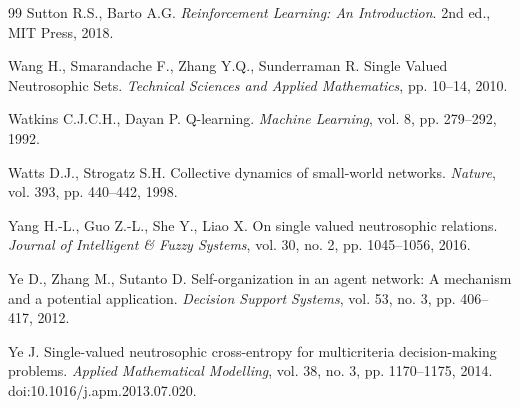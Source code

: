 \documentclass[11pt,a4paper]{article}
\begin{document}
\begin{thebibliography}{99}
		 Sutton R.S., Barto A.G. \textit{Reinforcement Learning: An Introduction}. 2nd ed., MIT Press, 2018.
		
		 Wang H., Smarandache F., Zhang Y.Q., Sunderraman R. Single Valued Neutrosophic Sets. \textit{Technical Sciences and Applied Mathematics}, pp. 10--14, 2010.
		
		 Watkins C.J.C.H., Dayan P. Q-learning. \textit{Machine Learning}, vol. 8, pp. 279--292, 1992.
		
		 Watts D.J., Strogatz S.H. Collective dynamics of small-world networks. \textit{Nature}, vol. 393, pp. 440--442, 1998.
		
		 Yang H.-L., Guo Z.-L., She Y., Liao X. On single valued neutrosophic relations. \textit{Journal of Intelligent \& Fuzzy Systems}, vol. 30, no. 2, pp. 1045--1056, 2016.
		
		 Ye D., Zhang M., Sutanto D. Self-organization in an agent network: A mechanism and a potential application. \textit{Decision Support Systems}, vol. 53, no. 3, pp. 406--417, 2012.
		
		Ye J. Single-valued neutrosophic cross-entropy for multicriteria decision-making problems. 
		\textit{Applied Mathematical Modelling}, vol. 38, no. 3, pp. 1170--1175, 2014. 
		doi:10.1016/j.apm.2013.07.020.
		
	\end{thebibliography}
	
\end{document}
